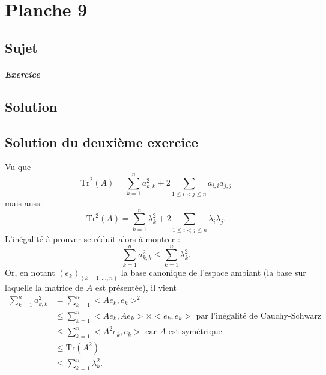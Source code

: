 \chapter{Planche 9}

\section{Sujet}

\paragraph{Exercice}

\section{Solution}

\section{Solution du deuxième exercice}

Vu que $$\mbox{Tr}^{2}(A)=\sum_{k=1}^{n}a_{k,k}^{2}+2\sum_{1\leq i<j\leq n}a_{i,i}a_{j,j}$$ mais aussi $$\mbox{Tr}^{2}(A)=\sum_{k=1}^{n}\lambda_{k}^{2}+2\sum_{1\leq i<j\leq n}\lambda_{i}\lambda_{j}.$$
L'inégalité à prouver se réduit alors à montrer : $$\sum_{k=1}^{n}a_{k,k}^{2}\leq \sum_{k=1}^{n}\lambda_{k}^{2}.$$
Or, en notant $(e_{k})_{(k=1,\ldots,n)}$ la base canonique de l'espace ambiant (la base sur laquelle la matrice de $A$ est présentée), il vient
\begin{align*}
\sum_{k=1}^{n}a_{k,k}^{2} & = \sum_{k=1}^{n}<Ae_{k},e_{k}>^{2}\\
& \leq \sum_{k=1}^{n}<Ae_{k},Ae_{k}>\times <e_{k},e_{k}> \mbox{  par l'inégalité de Cauchy-Schwarz }\\
& \leq \sum_{k=1}^{n}<A^{2}e_{k},e_{k}> \mbox{ car } A \mbox{ est symétrique}\\
& \leq \mbox{Tr}(A^{2})\\
& \leq \sum_{k=1}^{n}\lambda_{k}^{2}. 
\end{align*}